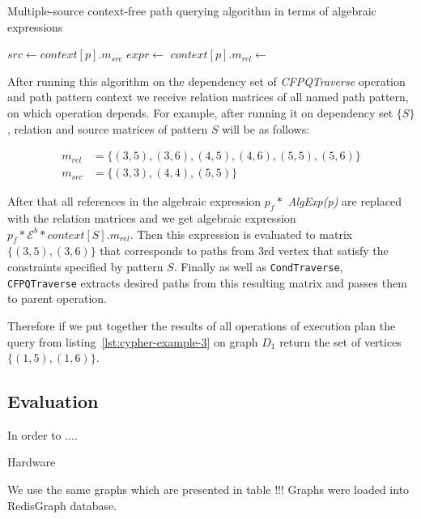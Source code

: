 \begin{algorithm}
\begin{algorithmic}[1]
\caption{Multiple-source context-free path querying algorithm in terms of algebraic expressions}
\label{alg:redisgraph-cfpq}
        \State $src \gets context[p].m_{src}$
        \State $expr \gets$ 
        \State {}
        \State $context[p].m_{rel} \gets$ 
    \EndFor
\EndWhile

\EndFunction
\end{algorithmic}
\end{algorithm}

After running this algorithm on the dependency set of \textit{CFPQTraverse} operation and path pattern context we receive relation matrices of all named path pattern, on which operation depends. For example, after running it on dependency set $\{S\}$, relation and source matrices of pattern $S$ will be as follows:

\begin{align*}
m_{rel} &= \{(3, 5), (3, 6), (4, 5), (4, 6), (5, 5), (5, 6)\} \\
m_{src} &= \{(3, 3), (4, 4), (5, 5)\}
\end{align*}

After that all references in the algebraic expression $p_f *$ \textit{Alg\-Exp(p)} are replaced with the relation matrices and we get algebraic expression $p_f * \mathcal{E}^b * context[S].m_{rel}$. Then this expression is evaluated to matrix $\{(3, 5), (3, 6)\}$ that corresponds to paths from 3rd vertex that satisfy the constraints specified by pattern $S$. Finally as well as \lstinline{CondTraverse}, \lstinline{CFPQTraverse} extracts desired paths from this resulting matrix and passes them to parent operation.

Therefore if we put together the results of all operations of execution plan the query from listing~\ref{lst:cypher-example-3} on graph $D_1$ return the set of vertices $\{(1, 5), (1, 6)\}$.

\subsection{Evaluation}

In order to ....

Hardware

We use the same graphs which are presented in table !!!
Graphs were loaded into RedisGraph database.


